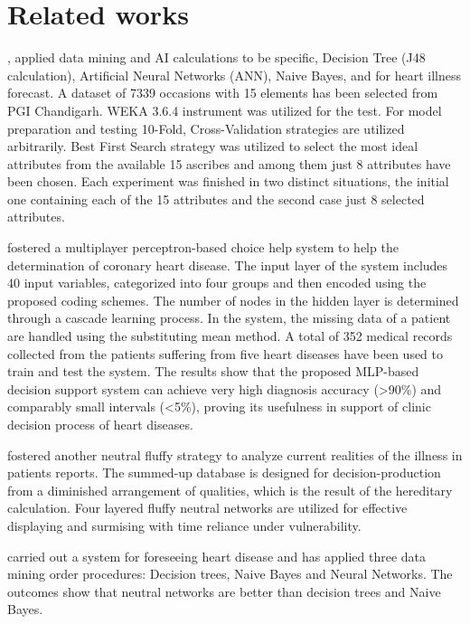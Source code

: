 \section{Related works}{
\setlength{\parskip}{1em}

\citealp{taneja2013heart}, applied data mining and AI calculations to be specific, Decision Tree (J48 calculation), Artificial Neural Networks (ANN), Naive Bayes, and for heart illness forecast. A dataset of 7339 occasions with 15 elements has been selected from PGI Chandigarh. WEKA 3.6.4 instrument was utilized for the test. For model preparation and testing 10-Fold, Cross-Validation strategies are utilized arbitrarily. Best First Search strategy was utilized to select the most ideal attributes from the available 15 ascribes and among them just 8 attributes have been chosen. Each experiment was finished in two distinct situations, the initial one containing each of the 15 attributes and the second case just 8 selected attributes.

\citealp{yan2006multilayer} fostered a multiplayer perceptron-based choice help system to help the determination of coronary heart disease. The input layer of the system includes 40 input variables, categorized into four groups and then encoded using the proposed coding schemes. The number of nodes in the hidden layer is determined through a cascade learning process. In the system, the missing data of a patient are handled using the substituting mean method. A total of 352 medical records collected from the patients suffering from five heart diseases have been used to train and test the system. The results show that the proposed MLP-based decision support system can achieve very high diagnosis accuracy (>90\%) and comparably small intervals (<5\%), proving its usefulness in support of clinic decision process of heart diseases.

\citealp{setthukkarase2012intelligent} fostered another neutral fluffy strategy to analyze current realities of the illness in patients reports. The summed-up database is designed for decision-production from a diminished arrangement of qualities, which is the result of the hereditary calculation. Four layered fluffy neutral networks are utilized for effective displaying and surmising with time reliance under vulnerability.

\citealp{dangare2012improved} carried out a system for foreseeing heart disease and has applied three data mining order procedures: Decision trees, Naive Bayes and Neural Networks. The outcomes show that neutral networks are better than decision trees and Naive Bayes.

}
